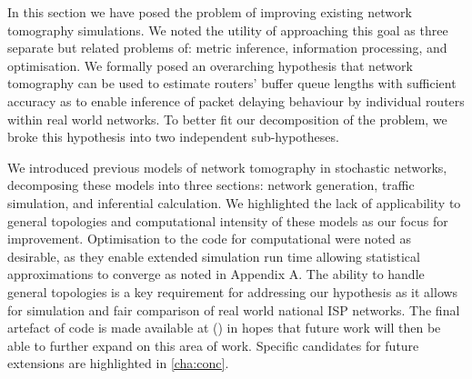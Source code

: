 In this section we have posed the problem of improving existing network tomography simulations. We noted the utility of approaching this goal as three separate but related problems of: metric inference, information processing, and optimisation. We formally posed an overarching hypothesis that network tomography can be used to estimate routers' buffer queue lengths with sufficient accuracy as to enable inference of packet delaying behaviour by individual routers within real world networks. To better fit our decomposition of the problem, we broke this hypothesis into two independent sub-hypotheses.\par
We introduced previous models of network tomography in stochastic networks, decomposing these models into three sections: network generation, traffic simulation, and inferential calculation. We highlighted the lack of applicability to general topologies and computational intensity of these models as our focus for improvement. 
Optimisation to the code for computational were noted as desirable, as they enable extended simulation run time allowing statistical approximations to converge as noted in Appendix A. The ability to handle general topologies is a key requirement for addressing our hypothesis as it allows for simulation and fair comparison of real world national ISP networks. The final artefact of code is made available at (\cite{sylvester_millar_real_2021}) in hopes that future work will then be able to further expand on this area of work. Specific candidates for future extensions are highlighted in \cref{cha:conc}.